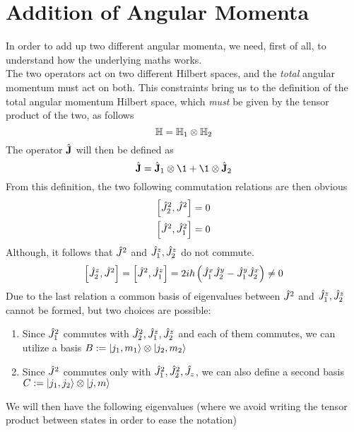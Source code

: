\documentclass[../qm.tex]{subfiles}
\begin{document}
	\section{Addition of Angular Momenta}
	In order to add up two different angular momenta, we need, first of all, to understand how the underlying maths works.\\
	The two operators act on two different Hilbert spaces, and the \textit{total} angular momentum must act on both. This constraints bring us to the definition of the total angular momentum Hilbert space, which \emph{must} be given by the tensor product of the two, as follows
	\begin{equation}
		\mathbb{H}=\mathbb{H}_1\otimes\mathbb{H}_2
		\label{eq:totalangmomspace}
	\end{equation}
	The operator $\hat{\mathbf{J}}$ will then be defined as
	\begin{equation}
		\vecopr{J}=\vecopr{J}_1\otimes\1+\1\otimes\vecopr{J}_2
		\label{eq:jdef}
	\end{equation}
	From this definition, the two following commutation relations are then obvious
	\begin{equation}
		\begin{aligned}
			\comm{\opr{J}_2^2}{\opr{J}^2}&=0\\
			\comm{\opr{J}^2}{\opr{J}_1^2}&=0
		\end{aligned}
		\label{eq:commreljsjl}
	\end{equation}
	Although, it follows that $\hat{J}^2$ and $\hat{J}_1^z,\hat{J}_2^z$ do not commute.
	\begin{equation}
		\comm{\opr{J}_2^z}{\opr{J}^2}=\comm{\opr{J}^2}{\opr{J}_1^z}=2i\hbar\left( \opr{J}_1^x\opr{J}_2^y-\opr{J}_1^y\opr{J}_2^x \right)\ne0
		\label{eq:commrelszj2lzj2}
	\end{equation}
	Due to the last relation a common basis of eigenvalues between $\hat{J}^2$ and $\hat{J}_1^z,\hat{J}_2^z$ cannot be formed, but two choices are possible:\\
	\begin{enumerate}
	\item Since $\hat{J}_1^2$ commutes with $\hat{J}_2^2,\hat{J}_1^z,\hat{J}_2^z$ and each of them commutes, we can utilize a basis $B:=\ket{j_1,m_1}\otimes\ket{j_2,m_2}$
	\item Since $\hat{J}^2$ commutes only with $\hat{J}_1^2,\hat{J}_2^2,\hat{J}_z$, we can also define a second basis $C:=\ket{j_1,j_2}\otimes\ket{j,m}$
	\end{enumerate}
	We will then have the following eigenvalues (where we avoid writing the tensor product between states in order to ease the notation)
\end{document}
